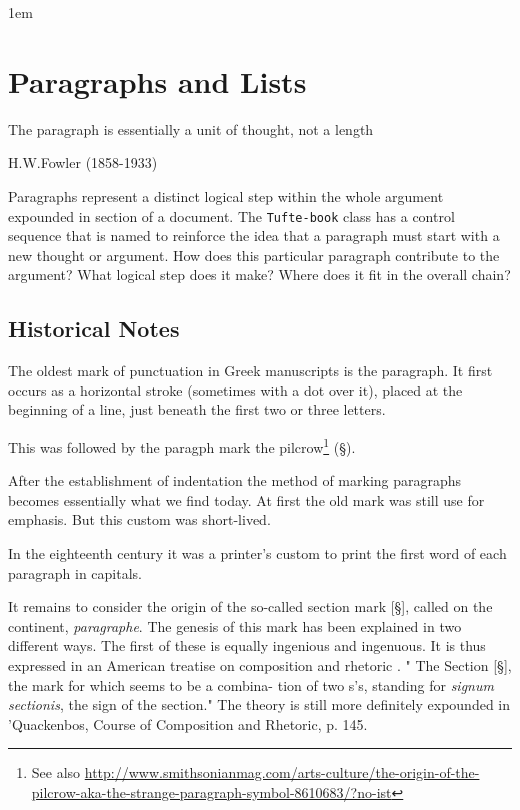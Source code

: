\parindent1em

\chapter{Paragraphs and Lists}

\epigraph{The paragraph is essentially a unit of thought, not a length}{H.W.Fowler (1858-1933)}

\noindent Paragraphs represent a distinct logical step within the whole argument expounded in section of a document. The \texttt{Tufte-book} class has a control sequence that is named \cmd{\newthought} to reinforce the idea that a paragraph must start with a new thought or argument. How does this particular paragraph contribute to the argument? 
What logical step does it make? Where does it fit in the overall chain?

\section{Historical Notes}

The oldest mark of punctuation in Greek manuscripts is the paragraph. It first occurs as a horizontal stroke (sometimes with a dot over it), placed at the beginning of a line, just beneath the first two or three letters.

This was followed by the paragph mark the pilcrow\footnote{See also \protect\url{http://www.smithsonianmag.com/arts-culture/the-origin-of-the-pilcrow-aka-the-strange-paragraph-symbol-8610683/?no-ist}} (\S). 

After the establishment of indentation the method of marking paragraphs becomes essentially what we find today. At first the old mark was still use for emphasis. But this custom was short-lived.

In the eighteenth century it was a printer’s custom to print the first word of each paragraph in capitals. 

It remains to consider the origin of the so-called section 
mark [\S], called on the continent, \emph{paragraphe}. The genesis of 
this mark has been explained in two different ways. The first 
of these is equally ingenious and ingenuous. It is thus 
expressed in an American treatise on composition and rhetoric . 
" The Section [\S], the mark for which seems to be a combina- 
tion of two s's, standing for \emph{signum sectionis}, the sign of the 
section." The theory is still more definitely expounded  in 
'Quackenbos, Course of Composition and Rhetoric, p. 145. 


